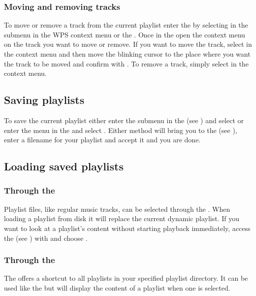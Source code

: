 \subsubsection{Moving and removing tracks}
To move or remove a track from the current playlist enter the
 by selecting  in the
 submenu in the WPS context menu or the .
Once in the  open the context menu on the track you
want to move or remove. If you want to move the track, select  in
the context menu and then move the blinking cursor to the place where you want
the track to be moved and confirm with \ActionStdOk. To remove a track, simply
select  in the context menu.

\subsection{Saving playlists}
To save the current playlist either enter the  submenu
in the  (see ) and
select  or enter the
 menu in the  and select
.
Either method will bring you to the  (see
), enter a filename for your playlist and
accept it and you are done.

\subsection{Loading saved playlists}
\subsubsection{Through the }
Playlist files, like regular music tracks, can be selected through the
. When loading a playlist from disk it will replace
the current dynamic playlist. If you want to look at a playlist's
content without starting playback immediately, access the  (see
) with \ActionStdContext{} and choose .

\subsubsection{Through the }
The  offers a shortcut to all playlists in your
\daps{} specified playlist directory.
It can be used like the  but will display
the content of a playlist when one is selected.

